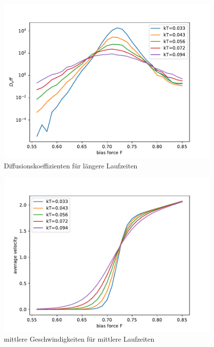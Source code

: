 \documentclass[12pt,a4paper]{article}
\begin{document}
\begin{figure}[H]
	\centering
	\includegraphics[scale=0.9]{dmechex.pdf} 
	\caption{Diffusionskoeffizienten für längere Laufzeiten}
	\label{dex}
\end{figure} 
\begin{figure}[H]
	\centering
	\includegraphics[scale=0.9]{gmechex.pdf} 
	\caption{mittlere Geschwindigkeiten für mittlere Laufzeiten}
	\label{gex}
\end{figure} 
\end{document}
